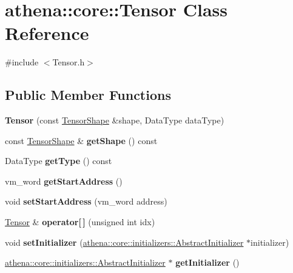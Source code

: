 \hypertarget{classathena_1_1core_1_1_tensor}{}\section{athena\+:\+:core\+:\+:Tensor Class Reference}
\label{classathena_1_1core_1_1_tensor}


{\ttfamily \#include $<$Tensor.\+h$>$}

\subsection*{Public Member Functions}
\begin{DoxyCompactItemize}
\item 
\mbox{\label{classathena_1_1core_1_1_tensor_a73df0da6b63c55ef90c4941aa23acc54}} 
{\bfseries Tensor} (const \mbox{\hyperlink{classathena_1_1core_1_1_tensor_shape}{Tensor\+Shape}} \&shape, Data\+Type data\+Type)
\item 
\mbox{\label{classathena_1_1core_1_1_tensor_af07b079821aadb1ec80c98b14617f2cb}} 
const \mbox{\hyperlink{classathena_1_1core_1_1_tensor_shape}{Tensor\+Shape}} \& {\bfseries get\+Shape} () const
\item 
\mbox{\label{classathena_1_1core_1_1_tensor_ac808b57b581b28ef78244bdc1f7eba0e}} 
Data\+Type {\bfseries get\+Type} () const
\item 
\mbox{\label{classathena_1_1core_1_1_tensor_ae864cbc773fa869a90bce479f03dbf68}} 
vm\+\_\+word {\bfseries get\+Start\+Address} ()
\item 
\mbox{\label{classathena_1_1core_1_1_tensor_a863c18e892c319b1e7fd359ddc7282ca}} 
void {\bfseries set\+Start\+Address} (vm\+\_\+word address)
\item 
\mbox{\label{classathena_1_1core_1_1_tensor_a98c05789432a4201a92ed2f7221d6882}} 
\mbox{\hyperlink{classathena_1_1core_1_1_tensor}{Tensor}} \& {\bfseries operator\mbox{[}$\,$\mbox{]}} (unsigned int idx)
\item 
\mbox{\label{classathena_1_1core_1_1_tensor_a1678afb415b41ac8890dfa8a3f1059ba}} 
void {\bfseries set\+Initializer} (\mbox{\hyperlink{classathena_1_1core_1_1initializers_1_1_abstract_initializer}{athena\+::core\+::initializers\+::\+Abstract\+Initializer}} $\ast$initializer)
\item 
\mbox{\label{classathena_1_1core_1_1_tensor_a92179636b42ee29fa2f3095a2bacb9a5}} 
\mbox{\hyperlink{classathena_1_1core_1_1initializers_1_1_abstract_initializer}{athena\+::core\+::initializers\+::\+Abstract\+Initializer}} $\ast$ {\bfseries get\+Initializer} ()
\end{DoxyCompactItemize}


